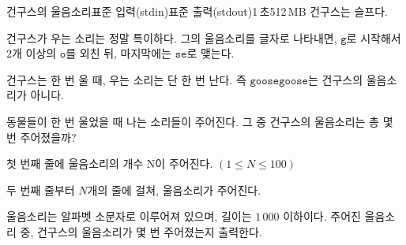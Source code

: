 \begin{problem}{건구스의 울음소리}{표준 입력(stdin)}{표준 출력(stdout)}{1\,초}{512\,MB}
건구스는 슬프다.

건구스가 우는 소리는 정말 특이하다. 그의 울음소리를 글자로 나타내면, $\texttt{g}$로 시작해서 $2$개 이상의 $\texttt{o}$를 외친 뒤, 마지막에는 $\texttt{se}$로 맺는다.

건구스는 한 번 울 때, 우는 소리는 단 한 번 난다. 즉 $\texttt{goosegoose}$는 건구스의 울음소리가 아니다.

동물들이 한 번 울었을 때 나는 소리들이 주어진다. 그 중 건구스의 울음소리는 총 몇 번 주어졌을까?

\InputFile
첫 번째 줄에 울음소리의 개수 N이 주어진다. $(1 \le N \le 100)$

두 번째 줄부터 $N$개의 줄에 걸쳐, 울음소리가 주어진다. 

울음소리는 알파벳 소문자로 이루어져 있으며, 길이는 $1\,000$ 이하이다.
\OutputFile
주어진 울음소리 중, 건구스의 울음소리가 몇 번 주어졌는지 출력한다.
\Examples

\begin{example}
%
\end{example}

\end{problem}
